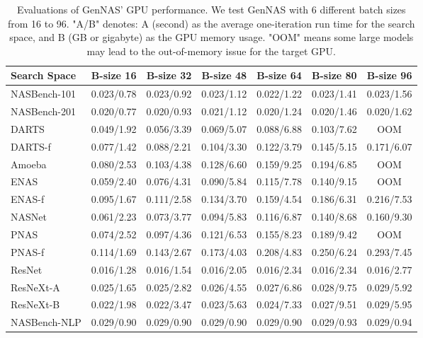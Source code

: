 \documentclass{article}
\begin{document}
\begin{table}[!h]
\caption{Evaluations of GenNAS' GPU performance. We test GenNAS with 6 different batch sizes from 16 to 96. "A/B" denotes: A (second) as the average one-iteration run time for the search space, and B (GB or gigabyte) as the GPU memory usage. "OOM" means some large models may lead to the out-of-memory issue for the target GPU. }\label{table:benchmarkgpu}
  \centering
  \small
\begin{tabular}{lcccccc}
\toprule
 Search Space&   B-size 16 & B-size 32 &B-size 48 &B-size 64 &B-size 80 &B-size 96 \\\midrule
 NASBench-101& 0.023/0.78 & 0.023/0.92 & 0.023/1.12 & 0.022/1.22 & 0.023/1.41 & 0.023/1.56 \\
 NASBench-201& 0.020/0.77 & 0.020/0.93 & 0.021/1.12 & 0.020/1.24 & 0.020/1.46 & 0.020/1.62 \\
 DARTS& 0.049/1.92 & 0.056/3.39 & 0.069/5.07 & 0.088/6.88 & 0.103/7.62 & OOM \\
 DARTS-f& 0.077/1.42 & 0.088/2.21 & 0.104/3.30 & 0.122/3.79 & 0.145/5.15 & 0.171/6.07 \\
 Amoeba& 0.080/2.53 & 0.103/4.38 & 0.128/6.60 & 0.159/9.25 & 0.194/6.85 & OOM \\
 ENAS& 0.059/2.40 & 0.076/4.31 & 0.090/5.84 & 0.115/7.78 & 0.140/9.15 & OOM \\
 ENAS-f& 0.095/1.67 &0.111/2.58 & 0.134/3.70 & 0.159/4.54 & 0.186/6.31 & 0.216/7.53 \\
 NASNet& 0.061/2.23 & 0.073/3.77 & 0.094/5.83 & 0.116/6.87 & 0.140/8.68 & 0.160/9.30 \\
 PNAS& 0.074/2.52 & 0.097/4.36 & 0.121/6.53 & 0.155/8.23 & 0.189/9.42 & OOM \\
 PNAS-f& 0.114/1.69 & 0.143/2.67 & 0.173/4.03 & 0.208/4.83 & 0.250/6.24 & 0.293/7.45 \\
 ResNet& 0.016/1.28 & 0.016/1.54 & 0.016/2.05 & 0.016/2.34 & 0.016/2.34 & 0.016/2.77 \\
 ResNeXt-A& 0.025/1.65 & 0.025/2.82 & 0.026/4.55 & 0.027/6.86 & 0.028/9.75 & 0.029/5.92 \\
 ResNeXt-B& 0.022/1.98 & 0.022/3.47 & 0.023/5.63 & 0.024/7.33 & 0.027/9.51 & 0.029/5.95 \\
 NASBench-NLP& 0.029/0.90 & 0.029/0.90 & 0.029/0.90 & 0.029/0.90 & 0.029/0.93 & 0.029/0.94\\\bottomrule
\end{tabular}
\end{table}
\end{document}
